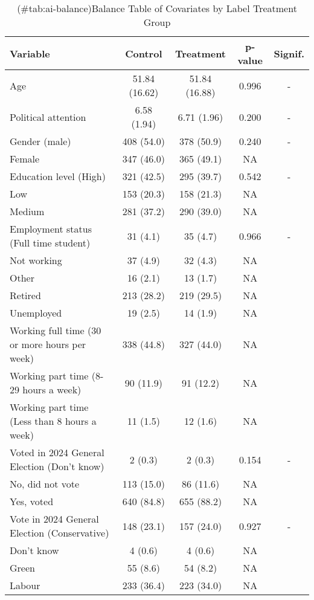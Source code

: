 \begin{table}
\centering
\caption{(\#tab:ai-balance)Balance Table of Covariates by Label Treatment Group \label{tab:label-balance}}
\centering
\fontsize{10}{12}\selectfont
\begin{threeparttable}
\begin{tabular}[t]{lcccc}
\toprule
Variable & Control & Treatment & p-value & Signif.\\
\midrule
Age & 51.84 (16.62) & 51.84 (16.88) & 0.996 & -\\
Political attention & 6.58 (1.94) & 6.71 (1.96) & 0.200 & -\\
Gender (male) & 408 (54.0) & 378 (50.9) & 0.240 & -\\
Female & 347 (46.0) & 365 (49.1) & NA & \\
Education level (High) & 321 (42.5) & 295 (39.7) & 0.542 & -\\
\addlinespace
Low & 153 (20.3) & 158 (21.3) & NA & \\
Medium & 281 (37.2) & 290 (39.0) & NA & \\
Employment status (Full time student) & 31 (4.1) & 35 (4.7) & 0.966 & -\\
Not working & 37 (4.9) & 32 (4.3) & NA & \\
Other & 16 (2.1) & 13 (1.7) & NA & \\
\addlinespace
Retired & 213 (28.2) & 219 (29.5) & NA & \\
Unemployed & 19 (2.5) & 14 (1.9) & NA & \\
Working full time (30 or more hours per week) & 338 (44.8) & 327 (44.0) & NA & \\
Working part time (8-29 hours a week) & 90 (11.9) & 91 (12.2) & NA & \\
Working part time (Less than 8 hours a week) & 11 (1.5) & 12 (1.6) & NA & \\
\addlinespace
Voted in 2024 General Election (Don't know) & 2 (0.3) & 2 (0.3) & 0.154 & -\\
No, did not vote & 113 (15.0) & 86 (11.6) & NA & \\
Yes, voted & 640 (84.8) & 655 (88.2) & NA & \\
Vote in 2024 General Election (Conservative) & 148 (23.1) & 157 (24.0) & 0.927 & -\\
Don't know & 4 (0.6) & 4 (0.6) & NA & \\
\addlinespace
Green & 55 (8.6) & 54 (8.2) & NA & \\
Labour & 233 (36.4) & 223 (34.0) & NA & \\

\end{tabular}
\end{threeparttable}
\end{table}
